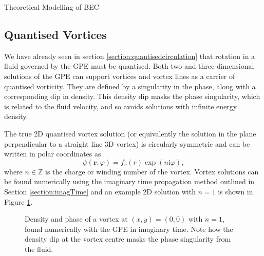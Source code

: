 \begin{chapter}{\label{cha:theoretical_model}Theoretical Modelling of BEC}
\subsection{\label{section:vortices} Quantised Vortices}
We have already seen in section \ref{section:quantisedcirculation} that rotation in a fluid governed by the GPE must be quantised. Both two and three-dimensional solutions of the GPE can support vortices and vortex lines as a carrier of quantised vorticity. They are defined by a singularity in the phase, along with a corresponding dip in density. This density dip masks the phase singularity, which is related to the fluid velocity, and so avoids solutions with infinite energy density.

The true 2D quantised vortex solution (or equivalently the solution in the plane perpendicular to a straight line 3D vortex) is circularly symmetric and can be written in polar coordinates as
	\begin{equation}\label{eq_vortexsol}
	\psi(\mathbf{r},\varphi) = f_v(r)\exp(n\mathrm{i}\varphi),
	\end{equation}
where $n\in\mathbb{Z}$ is the charge or winding number of the vortex. Vortex solutions can be found numerically using the imaginary time propagation method outlined in Section \ref{section:imagTime} and an example 2D solution with $n=1$ is shown in Figure \ref{fig_vortexdensphase}.

\begin{figure}
	\centering
  \caption{Density and phase of a vortex at $(x,y) = (0,0)$ with $n=1$, found numerically with the GPE in imaginary time. Note how the density dip at the vortex centre masks the phase singularity from the fluid. }\label{fig_vortexdensphase}
 \end{figure}


\end{chapter}
